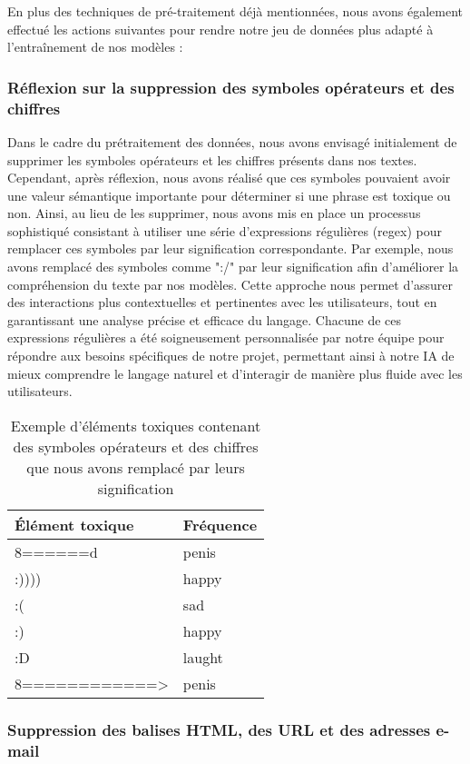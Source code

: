 En plus des techniques de pré-traitement déjà mentionnées, nous avons également effectué les actions suivantes pour rendre notre jeu de données plus adapté à l'entraînement de nos modèles :

\subsubsection*{Réflexion sur la suppression des symboles opérateurs et des chiffres}

Dans le cadre du prétraitement des données, nous avons envisagé initialement de supprimer les symboles opérateurs et les chiffres présents dans nos textes. Cependant, après réflexion, nous avons réalisé que ces symboles pouvaient avoir une valeur sémantique importante pour déterminer si une phrase est toxique ou non. Ainsi, au lieu de les supprimer, nous avons mis en place un processus sophistiqué consistant à utiliser une série d'expressions régulières (regex) pour remplacer ces symboles par leur signification correspondante. Par exemple, nous avons remplacé des symboles comme ":/" par leur signification afin d'améliorer la compréhension du texte par nos modèles. Cette approche nous permet d'assurer des interactions plus contextuelles et pertinentes avec les utilisateurs, tout en garantissant une analyse précise et efficace du langage. Chacune de ces expressions régulières a été soigneusement personnalisée par notre équipe pour répondre aux besoins spécifiques de notre projet, permettant ainsi à notre IA de mieux comprendre le langage naturel et d'interagir de manière plus fluide avec les utilisateurs.

\begin{table}[h]
\centering
\begin{tabular}{|l|l|}
\hline
\textbf{Élément toxique} & \textbf{Fréquence} \\ \hline
8======d~~ & penis \\ \hline
:)))) & happy \\ \hline
:( & sad \\ \hline
:) & happy \\ \hline
:D & laught \\ \hline
8============> & penis \\ \hline
\end{tabular}
\caption{Exemple d'éléments toxiques contenant des symboles opérateurs et des chiffres que nous avons remplacé par leurs signification}
\end{table}


\subsubsection*{Suppression des balises HTML, des URL et des adresses e-mail}

